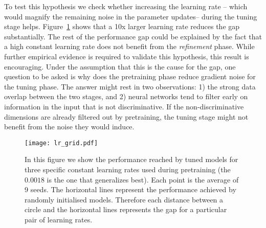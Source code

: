 To test this hypothesis we check whether increasing the learning rate -- which would magnify the remaining  noise in the parameter updates-- during the tuning stage helps.  Figure~\ref{fig:lr_grid} shows that a 10x larger learning rate reduces the gap substantially. The rest of the performance gap could be explained by the fact that a high constant learning rate does not benefit from the \emph{refinement} phase. While further empirical evidence is required to validate this hypothesis, this result is encouraging. Under the assumption that this is the cause for the gap, one question to be asked is why does the pretraining phase reduce gradient noise for the tuning phase. The answer might rest in two observations: 1) the strong data overlap between the two stages, and 2) neural networks tend to filter early on information in the input that is not discriminative. If the non-discriminative dimensions  are already filtered out by pretraining, the tuning stage might not benefit from the noise they would induce. 


\begin{figure}[h!tb]
    \centering%
    \texttt{[image: lr\_grid.pdf]}
    \caption{In this figure we show the performance reached by tuned models for three specific constant learning rates used during pretraining (the $0.0018$ is the one that generalizes best). Each point is the average of 9 seeds. The horizontal lines represent the performance achieved by randomly initialised models. Therefore each distance between a circle and the horizontal lines represents the gap for a particular pair of learning rates.}
    \label{fig:lr_grid}
\end{figure}


